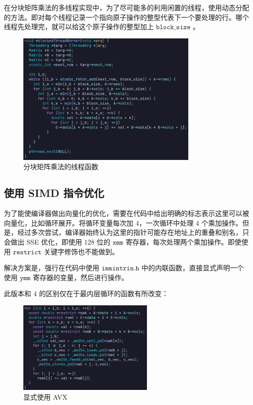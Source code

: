 \documentclass{article}
\begin{document}
在分块矩阵乘法的多线程实现中，为了尽可能多的利用闲置的线程，使用动态分配的方法。即对每个线程记录一个指向原子操作的整型代表下一个要处理的行。哪个线程先处理完，就可以给这个原子操作的整型加上 $\texttt{block\_size}$ 。

\begin{figure}[htbp]
  \centering
  \includegraphics[width=0.8\textwidth]{pics/v4code.png}
  \caption*{分块矩阵乘法的线程函数}
\end{figure}


\subsection{使用 SIMD 指令优化}

为了能使编译器做出向量化的优化，需要在代码中给出明确的标志表示这里可以被向量化，比如循环展开。将循环变量每次加 $4$，一次循环中处理 $4$ 个乘加操作。但是，经过多次尝试，编译器始终认为这里的指针可能存在地址上的重叠和别名，只会做出 SSE 优化，即使用 $128$ 位的 $\texttt{xmm}$ 寄存器，每次处理两个乘加操作。即使使用 $\texttt{restrict}$ 关键字修饰也不能做到。

解决方案是，强行在代码中使用 $\texttt{immintrin.h}$  中的内联函数，直接显式声明一个使用 $\texttt{ymm}$ 寄存器的变量，然后进行操作。

此版本和 $4$ 的区别仅在于最内层循环的函数有所改变：
\begin{figure}[htbp]
  \centering
  \includegraphics[width=0.6\textwidth]{pics/v5code.png}
  \caption*{显式使用 AVX}
\end{figure}
\end{document}
